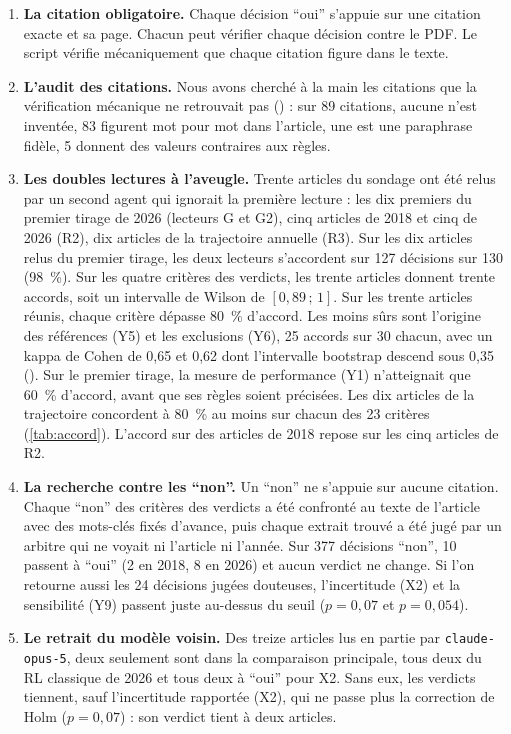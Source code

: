 \begin{enumerate}
  \item \textbf{La citation obligatoire.} Chaque décision \enquote{oui} s'appuie sur une citation
        exacte et sa page. Chacun peut vérifier chaque décision contre le PDF. Le script
         vérifie mécaniquement que chaque citation figure dans le texte.
  \item \textbf{L'audit des citations.} Nous avons cherché à la main les citations que la
        vérification mécanique ne retrouvait pas () : sur 89 citations, aucune n'est inventée, 83 figurent mot
        pour mot dans l'article, une est une paraphrase fidèle, 5 donnent des valeurs contraires aux
        règles.
  \item \textbf{Les doubles lectures à l'aveugle.} Trente articles du sondage ont été relus par un
        second agent qui ignorait la première lecture : les dix premiers du premier tirage de 2026
        (lecteurs G et G2), cinq articles de 2018 et cinq de 2026 (R2), dix articles de la
        trajectoire annuelle (R3). Sur les dix articles relus du premier tirage, les deux lecteurs
        s'accordent sur 127 décisions sur 130 (98~\%). Sur les quatre critères des verdicts, les
        trente articles donnent trente accords, soit un intervalle de Wilson de $[0{,}89\,;\,1]$.
        Sur les trente articles réunis, chaque critère dépasse 80~\% d'accord. Les moins sûrs sont
        l'origine des références (Y5) et les exclusions (Y6), 25 accords sur 30 chacun, avec un kappa de Cohen de 0,65 et 0,62 dont l'intervalle bootstrap
        descend sous 0,35 (). Sur le premier tirage, la
        mesure de performance (Y1) n'atteignait que 60~\% d'accord, avant que ses règles soient
        précisées. Les dix articles de la trajectoire concordent à 80~\% au moins sur chacun des 23
        critères (\cref{tab:accord}). L'accord sur des articles de 2018 repose sur les cinq articles
        de R2.
  \item \textbf{La recherche contre les \enquote{non}.} Un \enquote{non} ne s'appuie sur aucune
        citation. Chaque \enquote{non} des critères des verdicts a été confronté au texte de
        l'article avec des mots-clés fixés d'avance, puis chaque extrait trouvé a été jugé par un
        arbitre qui ne voyait ni l'article ni l'année. Sur 377 décisions \enquote{non},
        10 passent à \enquote{oui} (2 en 2018, 8 en 2026) et aucun verdict ne change. Si l'on
        retourne aussi les 24 décisions jugées douteuses, l'incertitude (X2) et la sensibilité (Y9)
        passent juste au-dessus du seuil ($p = 0{,}07$ et $p = 0{,}054$).
  \item \textbf{Le retrait du modèle voisin.} Des treize articles lus en partie par
        \texttt{claude-opus-5}, deux seulement sont dans la comparaison principale, tous deux du RL
        classique de 2026 et tous deux à \enquote{oui} pour X2. Sans eux, les verdicts tiennent,
        sauf l'incertitude rapportée (X2), qui ne passe plus la correction de Holm ($p = 0{,}07$) :
        son verdict tient à deux articles.
\end{enumerate}


